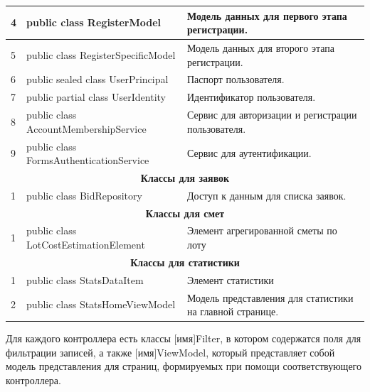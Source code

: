 \begin{footnotesize}
\begin{longtable}[h]{|p{}|p{}|p{}|}
	4 & public class RegisterModel & Модель данных для первого этапа регистрации. \\ \hline
	5 & public class RegisterSpecificModel & Модель данных для второго этапа регистрации. \\ \hline
	6 & public sealed class UserPrincipal & Паспорт пользователя. \\ \hline
	7 & public partial class UserIdentity & Идентификатор пользователя. \\ \hline
	8 & public class AccountMembershipService & Сервис для авторизации и регистрации пользователя. \\ \hline
	9 & public class FormsAuthenticationService & Сервис для аутентификации. \\ \hline
	\multicolumn{3}{|c|}{\textbf{Классы для заявок}} \\ \hline
	1 & public class BidRepository & Доступ к данным для списка заявок. \\ \hline
	\multicolumn{3}{|c|}{\textbf{Классы для смет}} \\ \hline
	1 & public class LotCostEstimationElement & Элемент агрегированной сметы по лоту \\ \hline
	\multicolumn{3}{|c|}{\textbf{Классы для статистики}} \\ \hline
	1 & public class StatsDataItem & Элемент статистики \\ \hline
	2 & public class StatsHomeViewModel & Модель представления для статистики на главной странице. \\ \hline
\end{longtable}
\end{footnotesize}

Для каждого контроллера есть классы [имя]Filter, в котором содержатся поля для фильтрации записей, а также [имя]ViewModel, который представляет собой модель представления для страниц, формируемых при помощи соответствующего контроллера.

